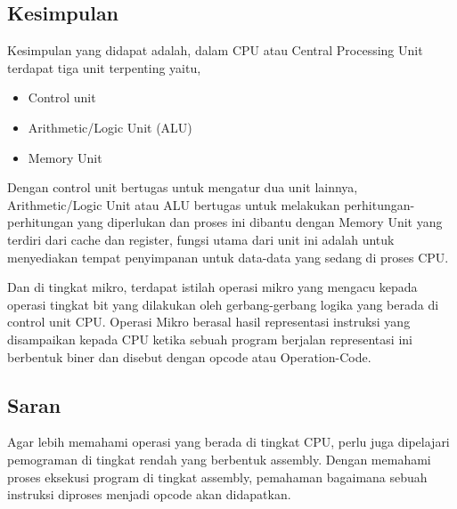 \subsection{Kesimpulan}

Kesimpulan yang didapat adalah, dalam CPU atau Central Processing Unit terdapat
tiga unit terpenting yaitu,

\begin{itemize}
  \item Control unit
  \item Arithmetic/Logic Unit (ALU)
  \item Memory Unit
\end{itemize}

Dengan control unit bertugas untuk mengatur dua unit lainnya, Arithmetic/Logic Unit
atau ALU bertugas untuk melakukan perhitungan-perhitungan yang diperlukan dan proses
ini dibantu dengan Memory Unit yang terdiri dari cache dan register, fungsi utama dari
unit ini adalah untuk menyediakan tempat penyimpanan untuk data-data yang sedang di proses CPU.

Dan di tingkat mikro, terdapat istilah operasi mikro yang mengacu kepada operasi tingkat
bit yang dilakukan oleh gerbang-gerbang logika yang berada di control unit CPU. Operasi Mikro
berasal hasil representasi instruksi yang disampaikan kepada CPU ketika sebuah program berjalan
representasi ini berbentuk biner dan disebut dengan opcode atau Operation-Code.

\subsection{Saran}

Agar lebih memahami operasi yang berada di tingkat CPU, perlu juga dipelajari
pemograman di tingkat rendah yang berbentuk assembly. Dengan memahami proses
eksekusi program di tingkat assembly, pemahaman bagaimana sebuah instruksi diproses
menjadi opcode akan didapatkan.

